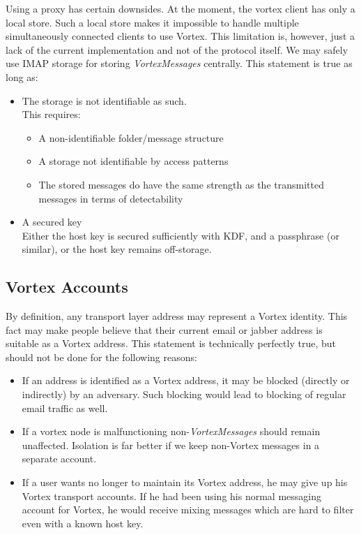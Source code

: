 Using a proxy has certain downsides. At the moment, the vortex client has only a local store. Such a local store makes it impossible to handle multiple simultaneously connected clients to use Vortex. This limitation is, however, just a lack of the current implementation and not of the protocol itself. We may safely use IMAP storage for storing \emph{VortexMessages} centrally. This statement is true as long as:
\begin{itemize}
	\item The storage is not identifiable as such.\\
	This requires:
	\begin{itemize}
		\item A non-identifiable folder/message structure
		\item A storage not identifiable by access patterns
		\item The stored messages do have the same strength as the transmitted messages in terms of detectability
	\end{itemize}
	\item A secured key\\
	Either the host key is secured sufficiently with KDF, and a passphrase (or similar), or the host key remains off-storage.
\end{itemize}

\subsection{Vortex Accounts}
By definition, any transport layer address may represent a Vortex identity. This fact may make people believe that their current email or jabber address is suitable as a Vortex address. This statement is technically perfectly true, but should not be done for the following reasons:
\begin{itemize}
	\item If an address is identified as a Vortex address, it may be blocked (directly or indirectly) by an adversary. Such blocking would lead to blocking of regular email traffic as well.
	\item If a vortex node is malfunctioning non-\emph{VortexMessages} should remain unaffected. Isolation is far better if we keep non-Vortex messages in a separate account.
	\item If a user wants no longer to maintain its Vortex address, he may give up his Vortex transport accounts. If he had been using his normal messaging account for Vortex, he would receive mixing messages which are hard to filter even with a known host key.
\end{itemize}

